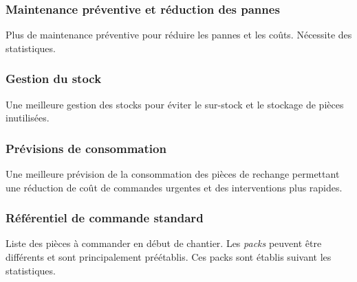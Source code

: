 \subsubsection{Maintenance préventive et réduction des pannes}

Plus de maintenance préventive pour réduire les pannes et les coûts.
Nécessite des statistiques.

\subsubsection{Gestion du stock}
	Une meilleure gestion des stocks pour éviter le sur-stock et le stockage de
pièces inutilisées.

\subsubsection{Prévisions de consommation}
	Une meilleure prévision de la consommation des pièces de rechange
permettant une réduction de coût de commandes urgentes et des interventions
plus rapides.

\subsubsection{Référentiel de commande standard}
	Liste des pièces à commander en début de chantier. Les {\sl packs} peuvent être
différents et sont principalement préétablis. Ces packs sont établis suivant
les statistiques.
